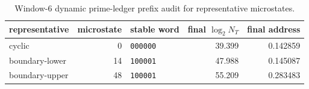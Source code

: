 \begin{table}[H]
\centering
\scriptsize
\setlength{\tabcolsep}{5pt}
\caption{Window-6 dynamic prime-ledger prefix audit for representative microstates.}
\label{tab:window6_prime_ledger_prefix_audit}
\begin{tabular}{l r l r r}
\toprule
representative & microstate & stable word & final $\log_2 N_T$ & final address\\
\midrule
cyclic & 0 & \texttt{000000} & 39.399 & 0.142859\\
boundary-lower & 14 & \texttt{100001} & 47.988 & 0.145087\\
boundary-upper & 48 & \texttt{100001} & 55.209 & 0.283483\\
\bottomrule
\end{tabular}
\end{table}
